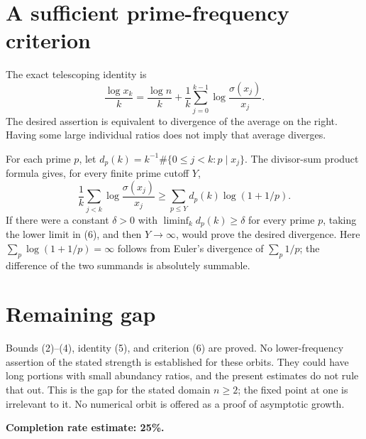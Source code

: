 \documentclass[11pt]{article}
\begin{document}
\section*{A sufficient prime-frequency criterion}
The exact telescoping identity is
\[
 \frac{\log x_k}{k}
 =\frac{\log n}{k}+\frac1k\sum_{j=0}^{k-1}\log\frac{\sigma(x_j)}{x_j}. \tag{5}
\]
The desired assertion is equivalent to divergence of the average on the right. Having some large individual ratios does not imply that average diverges.

For each prime $p$, let $d_p(k)=k^{-1}\#\{0\le j<k:p\mid x_j\}$. The divisor-sum product formula gives, for every finite prime cutoff $Y$,
\[
 \frac1k\sum_{j<k}\log\frac{\sigma(x_j)}{x_j}
 \ge\sum_{p\le Y}d_p(k)\log(1+1/p). \tag{6}
\]
If there were a constant $\delta>0$ with $\liminf_k d_p(k)\ge\delta$ for every prime $p$, taking the lower limit in (6), and then $Y\to\infty$, would prove the desired divergence. Here $\sum_p\log(1+1/p)=\infty$ follows from Euler's divergence of $\sum_p1/p$; the difference of the two summands is absolutely summable.

\section*{Remaining gap}
Bounds (2)--(4), identity (5), and criterion (6) are proved. No lower-frequency assertion of the stated strength is established for these orbits. They could have long portions with small abundancy ratios, and the present estimates do not rule that out. This is the gap for the stated domain $n\ge2$; the fixed point at one is irrelevant to it. No numerical orbit is offered as a proof of asymptotic growth.

\textbf{Completion rate estimate: 25\%.}
\end{document}
